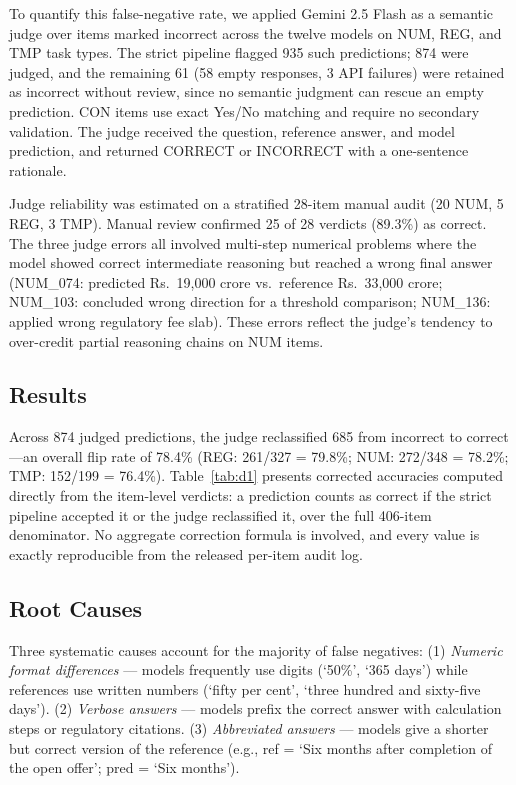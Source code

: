 \documentclass[11pt]{article}
\begin{document}
To quantify this false-negative rate, we applied Gemini 2.5 Flash as a semantic judge over items marked incorrect across the twelve models on NUM, REG, and TMP task types. The strict pipeline flagged 935 such predictions; 874 were judged, and the remaining 61 (58 empty responses, 3 API failures) were retained as incorrect without review, since no semantic judgment can rescue an empty prediction. CON items use exact Yes/No matching and require no secondary validation. The judge received the question, reference answer, and model prediction, and returned CORRECT or INCORRECT with a one-sentence rationale.

Judge reliability was estimated on a stratified 28-item manual audit (20 NUM, 5 REG, 3 TMP). Manual review confirmed 25 of 28 verdicts (89.3\%) as correct. The three judge errors all involved multi-step numerical problems where the model showed correct intermediate reasoning but reached a wrong final answer (NUM\_074: predicted Rs.~19,000 crore vs.\ reference Rs.~33,000 crore; NUM\_103: concluded wrong direction for a threshold comparison; NUM\_136: applied wrong regulatory fee slab). These errors reflect the judge's tendency to over-credit partial reasoning chains on NUM items.

\subsection{Results}

Across 874 judged predictions, the judge reclassified 685 from incorrect to correct---an overall flip rate of 78.4\% (REG: 261/327 = 79.8\%; NUM: 272/348 = 78.2\%; TMP: 152/199 = 76.4\%). Table~\ref{tab:d1} presents corrected accuracies computed directly from the item-level verdicts: a prediction counts as correct if the strict pipeline accepted it or the judge reclassified it, over the full 406-item denominator. No aggregate correction formula is involved, and every value is exactly reproducible from the released per-item audit log.

\subsection{Root Causes}

Three systematic causes account for the majority of false negatives: (1) \textit{Numeric format differences} --- models frequently use digits (`50\%', `365 days') while references use written numbers (`fifty per cent', `three hundred and sixty-five days'). (2) \textit{Verbose answers} --- models prefix the correct answer with calculation steps or regulatory citations. (3) \textit{Abbreviated answers} --- models give a shorter but correct version of the reference (e.g., ref = `Six months after completion of the open offer'; pred = `Six months').
\end{document}
